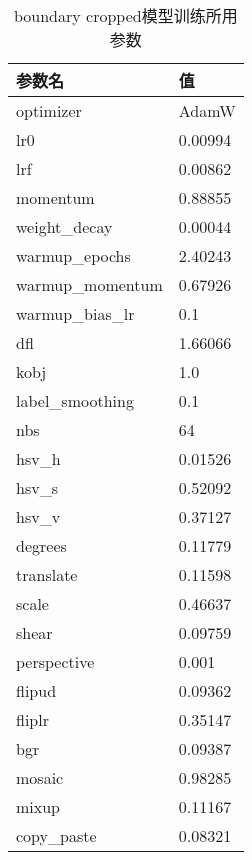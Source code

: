   \begin{table}
    \centering
  \begin{tabular}{ll}\toprule
     参数名&值\\\midrule
     optimizer&AdamW\\
     lr0&0.00994\\
lrf&0.00862\\
momentum&0.88855\\
weight\_decay&0.00044\\
warmup\_epochs&2.40243\\
warmup\_momentum&0.67926\\
warmup\_bias\_lr&0.1\\


dfl&1.66066\\

kobj&1.0\\
label\_smoothing&0.1\\
nbs&64\\
hsv\_h&0.01526\\
hsv\_s&0.52092\\
hsv\_v&0.37127\\
degrees&0.11779\\
translate&0.11598\\
scale&0.46637\\
shear&0.09759\\
perspective&0.001\\
flipud&0.09362\\
fliplr&0.35147\\
bgr&0.09387\\
mosaic&0.98285\\
mixup&0.11167\\
copy\_paste&0.08321\\
     \bottomrule
    \end{tabular}
    \caption{boundary cropped模型训练所用参数}
    \end{table}
   


